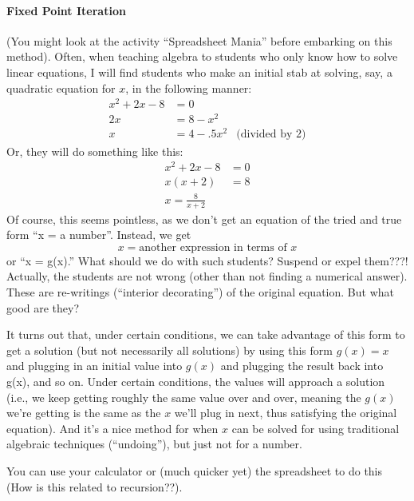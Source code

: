 \paragraph{Fixed Point Iteration} 
(You might look at the activity ``Spreadsheet Mania'' before embarking
on this method).  Often, when teaching algebra to students who only
know how to solve linear equations, I will find students who make an
initial stab at solving, say, a quadratic equation for $x$, in the
following manner:
\begin{align*}
x^2 + 2x -8 &= 0 & \\
2x &= 8 - x^2 & \\
x &= 4- .5 x^2 & \text{(divided by $2$)}
\end{align*}
Or, they will do something like this:
\begin{align*}
x^2 + 2x -8 &= 0 \\
x(x+2) &= 8 \\
x = \frac{8}{x+2}
\end{align*}
Of course, this seems pointless, as we don't get an equation of the
tried and true form ``x = a number''.  Instead, we get 
\[
x= \text{another expression in terms of $x$} 
\]
or ``x = g(x).'' What should we do with such students?  Suspend or
expel them???! Actually, the students are not wrong (other than not
finding a numerical answer).  These are re-writings (``interior
decorating'') of the original equation.  But what good are they?

It turns out that, under certain conditions, we can take advantage of
this form to get a solution (but not necessarily all solutions) by
using this form $g(x)=x$ and plugging in an initial value into $g(x)$
and plugging the result back into g(x), and so on.  Under certain
conditions, the values will approach a solution (i.e., we keep getting
roughly the same value over and over, meaning the $g(x)$ we're getting
is the same as the $x$ we'll plug in next, thus satisfying the
original equation).  And it's a nice method for when $x$ can be solved
for using traditional algebraic techniques (``undoing''), but just not
for a number.
      
You can use your calculator or (much quicker yet) the spreadsheet to
do this (How is this related to recursion??).
      
